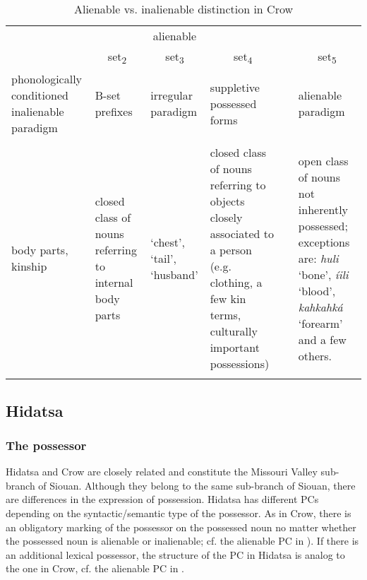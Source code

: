 \documentclass[output=paper]{LSP/langsci}
\begin{document}
\begin{table}
\caption{Alienable vs. inalienable distinction in Crow} \label{crowalienability}  
\begin{tabularx}{\textwidth}{ Xp{2cm}XXcX }
\lsptoprule
\multicolumn{4}{c}{inalienable } && \multicolumn{1}{c}{alienable} \\
\hhline{----~-}
\multicolumn{1}{c}{set\textsubscript{1}} &
\multicolumn{1}{c}{ set\textsubscript{2}}	& 
\multicolumn{1}{c}{set\textsubscript{3}} & 
\multicolumn{1}{c}{set\textsubscript{4}} && 
\multicolumn{1}{c}{set\textsubscript{5}} \\
\midrule
phonologically conditioned inalienable paradigm & 	B-set  \mbox{prefixes} & irregular  paradigm & suppletive possessed forms && alienable paradigm \\ 
\\

body parts, kinship & 
 \raggedright closed class  of nouns  referring to  internal body  parts & 
`chest', `tail', `husband'	  & 
\raggedright closed class of nouns  referring to objects  closely associated to a person (e.g. clothing, a few kin terms, culturally  important possessions)  && 
open class of nouns not inherently possessed; exceptions are: \textit{huli}  `bone', \textit{íili} `blood',  \textit{kahkahká} `forearm' and a  few others. \\ 
\lspbottomrule
\end{tabularx}  
\end{table}

\subsection{Hidatsa}
\subsubsection{The possessor}
Hidatsa and Crow are closely related and constitute the Missouri Valley sub-branch of Siouan. Although they belong to the same sub-branch of Siouan, there are differences in the expression of possession. Hidatsa has different PCs depending on the syntactic/semantic type of the possessor. As in Crow, there is an obligatory marking of the possessor on the possessed noun no matter whether the possessed noun is alienable or inalienable; cf. the alienable PC in ). If there is an additional lexical possessor, the structure of the PC in Hidatsa is analog to the one in Crow, cf. the alienable PC in .
\end{document}
